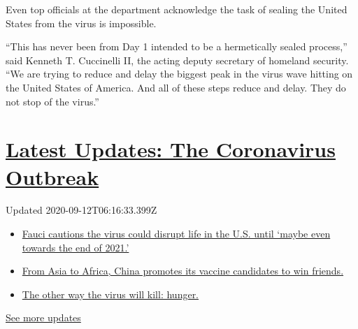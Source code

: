Even top officials at the department acknowledge the task of sealing the
United States from the virus is impossible.

``This has never been from Day 1 intended to be a hermetically sealed
process,'' said Kenneth T. Cuccinelli II, the acting deputy secretary of
homeland security. ``We are trying to reduce and delay the biggest peak
in the virus wave hitting on the United States of America. And all of
these steps reduce and delay. They do not stop of the virus.''

\hypertarget{latest-updates-the-coronavirus-outbreak}{%
\section{\texorpdfstring{\href{https://www.nytimes3xbfgragh.onion/2020/09/11/world/covid-19-coronavirus.html?action=click\&pgtype=Article\&state=default\&region=MAIN_CONTENT_1\&context=storylines_live_updates}{Latest
Updates: The Coronavirus
Outbreak}}{Latest Updates: The Coronavirus Outbreak}}\label{latest-updates-the-coronavirus-outbreak}}

Updated 2020-09-12T06:16:33.399Z

\begin{itemize}
\tightlist
\item
  \href{https://www.nytimes3xbfgragh.onion/2020/09/11/world/covid-19-coronavirus.html?action=click\&pgtype=Article\&state=default\&region=MAIN_CONTENT_1\&context=storylines_live_updates\#link-dfb8a16}{Fauci
  cautions the virus could disrupt life in the U.S. until `maybe even
  towards the end of 2021.'}
\item
  \href{https://www.nytimes3xbfgragh.onion/2020/09/11/world/covid-19-coronavirus.html?action=click\&pgtype=Article\&state=default\&region=MAIN_CONTENT_1\&context=storylines_live_updates\#link-7104d154}{From
  Asia to Africa, China promotes its vaccine candidates to win friends.}
\item
  \href{https://www.nytimes3xbfgragh.onion/2020/09/11/world/covid-19-coronavirus.html?action=click\&pgtype=Article\&state=default\&region=MAIN_CONTENT_1\&context=storylines_live_updates\#link-393ad215}{The
  other way the virus will kill: hunger.}
\end{itemize}

\href{https://www.nytimes3xbfgragh.onion/2020/09/11/world/covid-19-coronavirus.html?action=click\&pgtype=Article\&state=default\&region=MAIN_CONTENT_1\&context=storylines_live_updates}{See
more updates}

